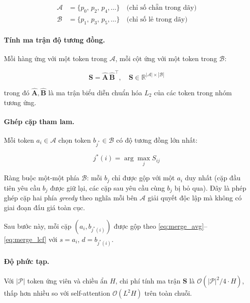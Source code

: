 \begin{align}
  \mathcal{A} &= \{p_0,\, p_2,\, p_4, \dots\} \quad \text{(chỉ số
    chẵn trong dãy)}\label{eq:group_A}\\
  \mathcal{B} &= \{p_1,\, p_3,\, p_5, \dots\} \quad \text{(chỉ số
    lẻ trong dãy)}\label{eq:group_B}
\end{align}

\paragraph{Tính ma trận độ tương đồng.}
Mỗi hàng ứng với một token trong $\mathcal{A}$, mỗi cột ứng với một
token trong $\mathcal{B}$:

\begin{equation}
  \mathbf{S} = \widehat{\mathbf{A}}\, \widehat{\mathbf{B}}^{\top},
  \quad \mathbf{S} \in \mathbb{R}^{|\mathcal{A}| \times |\mathcal{B}|}
  \label{eq:bipartite_score}
\end{equation}

\noindent trong đó $\widehat{\mathbf{A}}, \widehat{\mathbf{B}}$ là ma
trận biểu diễn chuẩn hóa $L_2$ của các token trong nhóm tương ứng.

\paragraph{Ghép cặp tham lam.}
Mỗi token $a_i \in \mathcal{A}$ chọn token $b_{j^*} \in \mathcal{B}$
có độ tương đồng lớn nhất:

\begin{equation}
  j^*(i) = \arg\max_{j} S_{ij}
  \label{eq:greedy_assign}
\end{equation}

Ràng buộc một-một phía $\mathcal{B}$: mỗi $b_j$ chỉ được gộp với một
$a_i$ duy nhất (cặp đầu tiên yêu cầu $b_j$ được giữ lại, các cặp sau
yêu cầu cùng $b_j$ bị bỏ qua).  Đây là phép ghép cặp hai phía
\textit{greedy} theo nghĩa mỗi bên $\mathcal{A}$ giải quyết độc lập
mà không có giai đoạn đấu giá toàn cục.

Sau bước này, mỗi cặp $(a_i, b_{j^*(i)})$ được gộp theo
\eqref{eq:merge_avg}--\eqref{eq:merge_lcf} với $s = a_i$, $d =
b_{j^*(i)}$.

\paragraph{Độ phức tạp.}
Với $|\mathcal{P}|$ token ứng viên và chiều ẩn $H$, chi phí tính ma
trận $\mathbf{S}$ là $\mathcal{O}(|\mathcal{P}|^2 / 4 \cdot H)$, thấp
hơn nhiều so với self-attention $\mathcal{O}(L^2 H)$ trên toàn chuỗi.

